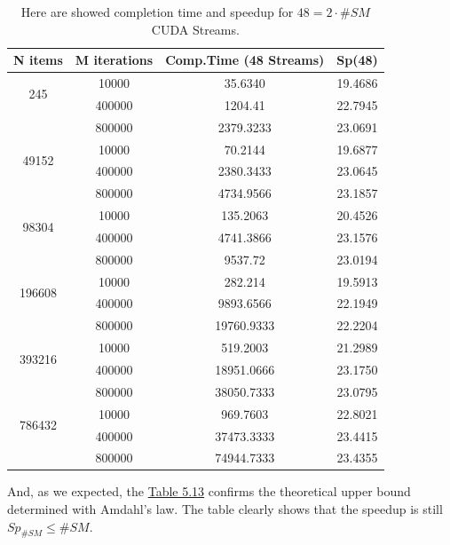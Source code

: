 \begin{table}	
	\centering
	\begin{tabular}{ | c  c || c | c | } 
		\hline
		  N items & M iterations & Comp.Time (48 Streams) & Sp(48) \\ [0.5ex]
		\hline	
		\hline	
	
		\multirow{2}{*}{245}&	10000&	35.6340&	19.4686\\
		& 	400000&	1204.41&	22.7945\\
		&	800000&	2379.3233&	23.0691\\
		\hline
		\multirow{2}{*}{49152}&	10000&	70.2144&	19.6877\\
		&	400000&	2380.3433&	23.0645\\
		&	800000&	4734.9566&	23.1857\\
		\hline
		\multirow{2}{*}{98304}&	10000&	135.2063&	20.4526\\
		&	400000&	4741.3866&	23.1576\\
		&	800000&	9537.72&	23.0194\\
		\hline
		\multirow{2}{*}{196608}&	10000&	282.214&	19.5913\\
		&	400000&	9893.6566&	22.1949\\
		&	800000&	19760.9333&	22.2204\\
		\hline
		\multirow{2}{*}{393216}&	10000&	519.2003&	21.2989\\
		&	400000&	18951.0666&	23.1750\\
		&	800000&	38050.7333&	23.0795\\
		\hline
		\multirow{2}{*}{786432}&	10000&	969.7603&	22.8021\\
		&	400000&	37473.3333&	23.4415\\
		&	800000&	74944.7333&	23.4355\\

		
		\hline
		
		
	\end{tabular}
	\caption{Here are showed completion time and speedup for \(48 = 2 \cdot \#SM\) CUDA Streams. }	
	\label{tab:cosdoublestream}		
\end{table}


And, as we expected, the \hyperref[tab:cosdoublestream]{Table 5.13} confirms the theoretical upper bound determined with Amdahl's law. The table clearly shows that the speedup is still \(Sp_{\#SM}\leq\#SM\).





